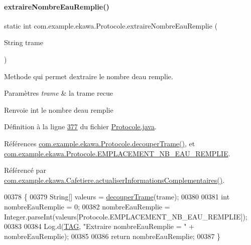\paragraph{\texorpdfstring{extraire\+Nombre\+Eau\+Remplie()}{extraireNombreEauRemplie()}}
{\footnotesize\ttfamily static int com.\+example.\+ekawa.\+Protocole.\+extraire\+Nombre\+Eau\+Remplie (\begin{DoxyParamCaption}\item[{String}]{trame }\end{DoxyParamCaption})\hspace{0.3cm}{\ttfamily [static]}}



Methode qui permet d\textquotesingle{}extraire le nombre d\textquotesingle{}eau remplie. 


\begin{DoxyParams}{Paramètres}
{\em trame} & la trame recue \\
\hline
\end{DoxyParams}
\begin{DoxyReturn}{Renvoie}
int le nombre d\textquotesingle{}eau remplie 
\end{DoxyReturn}


Définition à la ligne \hyperlink{_protocole_8java_source_l00377}{377} du fichier \hyperlink{_protocole_8java_source}{Protocole.\+java}.



Références \hyperlink{_protocole_8java_source_l00208}{com.\+example.\+ekawa.\+Protocole.\+decouper\+Trame()}, et \hyperlink{_protocole_8java_source_l00066}{com.\+example.\+ekawa.\+Protocole.\+E\+M\+P\+L\+A\+C\+E\+M\+E\+N\+T\+\_\+\+N\+B\+\_\+\+E\+A\+U\+\_\+\+R\+E\+M\+P\+L\+IE}.



Référencé par \hyperlink{_cafetiere_8java_source_l00574}{com.\+example.\+ekawa.\+Cafetiere.\+actualiser\+Informations\+Complementaires()}.


\begin{DoxyCode}
00378     \{
00379         String[] valeurs = \hyperlink{classcom_1_1example_1_1ekawa_1_1_protocole_a23c261e4ab5ad3c2ac60187f04ae40ea}{decouperTrame}(trame);
00380 
00381         \textcolor{keywordtype}{int} nombreEauRemplie = 0;
00382         nombreEauRemplie = Integer.parseInt(valeurs[Protocole.EMPLACEMENT\_NB\_EAU\_REMPLIE]);
00383 
00384         Log.d(\hyperlink{classcom_1_1example_1_1ekawa_1_1_protocole_ae9b68fa0daac528421b887f19413f8f5}{TAG}, \textcolor{stringliteral}{"Extraire nombreEauRemplie = "} + nombreEauRemplie);
00385 
00386         \textcolor{keywordflow}{return} nombreEauRemplie;
00387     \}
\end{DoxyCode}
\mbox{\label{classcom_1_1example_1_1ekawa_1_1_protocole_a8f7c96aaa3fad76354e1cb4665c85e57}} 
